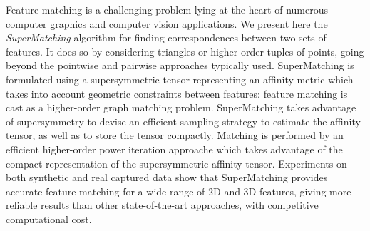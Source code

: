 Feature matching is a challenging problem lying at the heart of numerous computer graphics and computer vision applications.
We present here the \emph{SuperMatching} algorithm for finding correspondences between two sets of features.
It does so by considering triangles or higher-order tuples of points, going beyond the pointwise and pairwise approaches typically used.
SuperMatching is formulated using a supersymmetric tensor representing an affinity metric which takes into account geometric constraints between features:
feature matching is cast as a higher-order graph matching problem.
SuperMatching takes advantage of supersymmetry to devise an
efficient sampling strategy to estimate the affinity tensor, as well as to store the tensor compactly.
Matching is performed by an efficient higher-order power iteration approache which takes advantage of the compact representation of the supersymmetric affinity tensor.
Experiments on both synthetic and real captured data show that
SuperMatching provides accurate feature matching for a wide range of 2D and 3D features,
giving more reliable results than other state-of-the-art approaches, with competitive computational cost. 